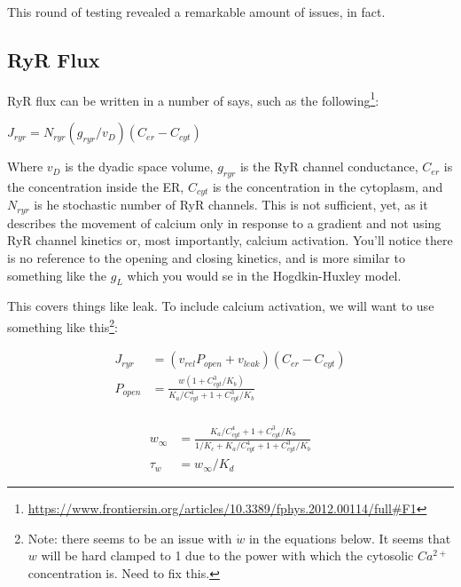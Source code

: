 \documentclass[12pt]{amsart}
\begin{document}
This round of testing revealed a remarkable amount of issues, in fact.


\subsection{RyR Flux} RyR flux can be written in a number of says, such as the following\footnote{\url{https://www.frontiersin.org/articles/10.3389/fphys.2012.00114/full\#F1}}: 

\bigskip

\begin{center}

    $J_{ryr} = N_{ryr}(g_{ryr}/v_D)(C_{er} - C_{cyt})$
    
\end{center}

\bigskip

Where $v_D$ is the dyadic space volume, $g_{ryr}$ is the RyR channel conductance, $C_{er}$ is the concentration inside the ER, $C_{cyt}$ is the concentration in the cytoplasm, and $N_{ryr}$ is he stochastic number of RyR channels. This is not sufficient, yet, as it describes the movement of calcium only in response to a gradient and not using RyR channel kinetics or, most importantly, calcium activation. You'll notice there is no reference to the opening and closing kinetics, and is more similar to something like the $g_L$ which you would se in the Hogdkin-Huxley model.\newline

This covers things like leak. To include calcium activation, we will want to use something like this\footnote{Note: there seems to be an issue with $\dot{w}$ in the equations below. It seems that $w$ will be hard clamped to 1 due to the power with which the cytosolic $Ca^{2+}$ concentration is. Need to fix this.}: 

\bigskip

\begin{equation} \label{eq8}
\begin{split}
J_{ryr} &= (v_{rel}P_{open} + v_{leak})(C_{er} - C_{cyt})\\
P_{open} &= \frac{w(1 + C^3_{cyt} / K_b)}{K_a / C^4_{cyt} + 1 + C_{cyt}^3/ K_b}\\
\end{split}
\end{equation}

\begin{equation} \label{eq8}
\begin{split}
w_{\infty} &= \frac{K_a / C^4_{cyt} + 1 + C_{cyt}^3/ K_b}{1/K_c + K_a / C^4_{cyt} + 1 + C_{cyt}^3/ K_b} \\
\tau_w &= w_{\infty}/K_d
\end{split}
\end{equation}
\end{document}
